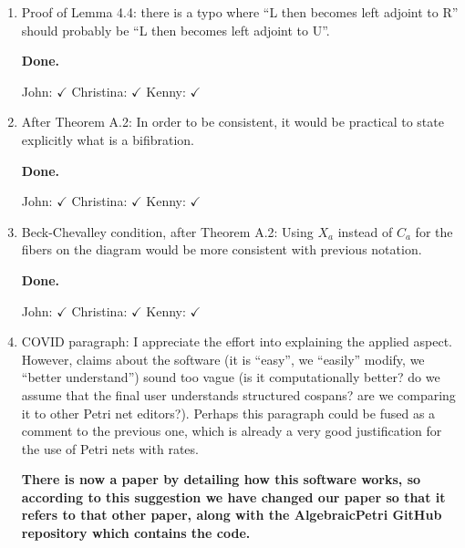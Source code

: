 \documentclass[reqno]{amsart}
\def\chris{\color{purple} Christina: }
\def\john{\color{red} John: }
\def\kenny{\color{blue} Kenny: }
\begin{document}
\begin{enumerate}
{\john  Okay, that makes sense.   I put the paragraph back in and changed it a bunch: basically, I added some more steps so people who don't know what 
we're doing will have an easier time figuring it out.   Does it look okay to you?}

{\chris Yes it does, thanks! Although in my mind, it kinda goes the opposite way: e.g. the already induced monoidal product on the fibers ends up 
having the universal property of a coproduct for example. Possibly just overthinking and getting mixed up with words.}

{\john I changed the paragraph, trying to solve the problem Christina just mentioned.}

{\chris Looks good!}
\fi

\item Proof of Lemma 4.4: there is a typo where “L then becomes left adjoint to R” should probably be “L then becomes left adjoint to U”.

{\bf Done.}  

{\john $\checkmark$} {\chris $\checkmark$} {\kenny $\checkmark$}

\item After Theorem A.2: In order to be consistent, it would be practical to state explicitly what is a bifibration.

{\bf Done.} 

{\john $\checkmark$} {\chris $\checkmark$} {\kenny $\checkmark$}

\item Beck-Chevalley condition, after Theorem A.2: Using $X_a$ instead of $C_a$ for the fibers on the diagram would be more consistent with previous 
notation.

{\bf Done.} 

{\john $\checkmark$} {\chris $\checkmark$} {\kenny $\checkmark$}

\item COVID paragraph: I appreciate the effort into explaining the applied aspect. However, claims about the software (it is ``easy'', we ``easily'' modify, we ``better understand'') sound too vague (is it computationally better? do we assume that the final user understands structured cospans? are we comparing  it to other Petri net editors?). Perhaps this paragraph could be fused as a comment to the previous one, which is already a very good justification  for the use of Petri nets with rates.

{\bf There is now a paper by detailing how this software works, so according to this suggestion we have changed our paper so that it  refers to that other paper, along with the AlgebraicPetri GitHub repository which contains the code.} 


\end{enumerate}
\end{document}
